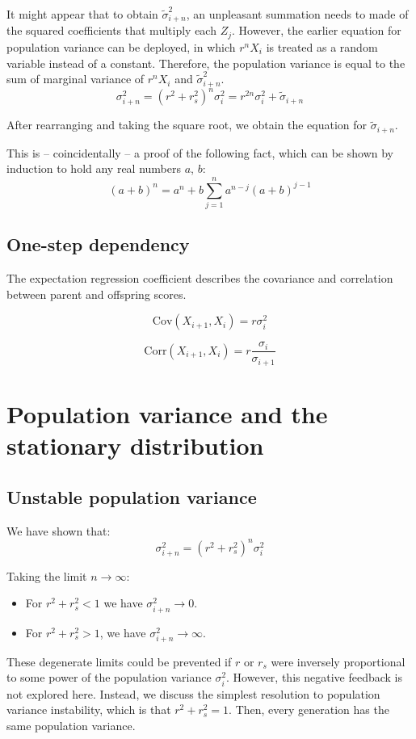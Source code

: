 \documentclass[a4paper,11pt]{article}
\begin{document}
It might appear that to obtain $\tilde{\sigma}_{i+n}^2$, an unpleasant summation needs to made of the squared coefficients that multiply each $Z_j$. However, the earlier equation for population variance can be deployed, in which $r^nX_i$ is treated as a random variable instead of a constant. Therefore, the population variance is equal to the sum of marginal variance of $r^nX_i$ and $\tilde{\sigma}_{i+n}^2$.
$$\sigma_{i+n}^2 =  (r^2+r_s^2)^n  \sigma_{i}^2 =  r^{2n}\sigma_i^2 + \tilde{\sigma}_{i+n}$$

After rearranging and taking the square root, we obtain the equation for $\tilde{\sigma}_{i+n}$.

This is -- coincidentally -- a proof of the following fact, which can be shown by induction to hold any real numbers $a$,  $b$:
$$(a+b)^n = a^n + b \sum_{j=1}^{n}a^{n-j}(a+b)^{j-1}$$


\subsection{One-step dependency}
The expectation regression coefficient describes the covariance and correlation between parent and offspring scores. 

$$\mathrm{Cov}(X_{i+1}, X_i) = r \sigma_i^2$$

$$\mathrm{Corr}(X_{i+1}, X_i) = r \frac{\sigma_i}{\sigma_{i+1}}$$



\section{Population variance and the stationary distribution}

\subsection{Unstable population variance}
We have shown that:
$$\sigma_{i+n}^2 = (r^2+r_s^2)^n  \sigma_{i}^2$$

Taking the limit $n \rightarrow \infty$: 
\begin{itemize}
\item For $r^2+r_s^2 < 1$ we have $\sigma_{i+n}^2 \rightarrow 0$.
\item For  $r^2+r_s^2 > 1$, we have $\sigma_{i+n}^2 \rightarrow \infty$. 
\end{itemize}

These degenerate limits could be prevented if $r$ or $r_s$ were inversely proportional to some power of the population variance $\sigma_i^2$. However, this negative feedback is not explored here. Instead, we discuss the simplest resolution to population variance instability, which is that $r^2+r_s^2 = 1$. Then, every generation has the same population variance.
\end{document}
